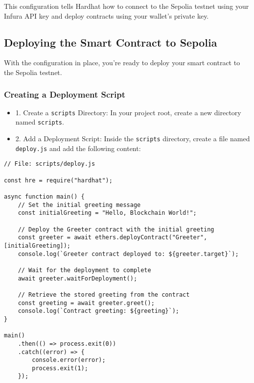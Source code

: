 \documentclass[12pt]{article}
\begin{document}
\noindent
This configuration tells Hardhat how to connect to the Sepolia testnet using your Infura API key and deploy contracts using your wallet's private key.

\subsection{Deploying the Smart Contract to Sepolia}

With the configuration in place, you're ready to deploy your smart contract to the Sepolia testnet.

\subsubsection{Creating a Deployment Script}

\begin{itemize}
\item 1. Create a \texttt{scripts} Directory: In your project root, create a new directory named \texttt{scripts}.

\item 2. Add a Deployment Script: Inside the \texttt{scripts} directory, create a file named \texttt{deploy.js} and add the following content:
\end{itemize}

\noindent
\begin{minipage}[c]{\textwidth}
\begin{verbatim}
// File: scripts/deploy.js

const hre = require("hardhat");

async function main() {
    // Set the initial greeting message
    const initialGreeting = "Hello, Blockchain World!";
    
    // Deploy the Greeter contract with the initial greeting
    const greeter = await ethers.deployContract("Greeter", [initialGreeting]);
    console.log(`Greeter contract deployed to: ${greeter.target}`);

    // Wait for the deployment to complete
    await greeter.waitForDeployment();

    // Retrieve the stored greeting from the contract
    const greeting = await greeter.greet();
    console.log(`Contract greeting: ${greeting}`);
}

main()
    .then(() => process.exit(0))
    .catch((error) => {
        console.error(error);
        process.exit(1);
    });
\end{verbatim}
\end{minipage}
\end{document}
